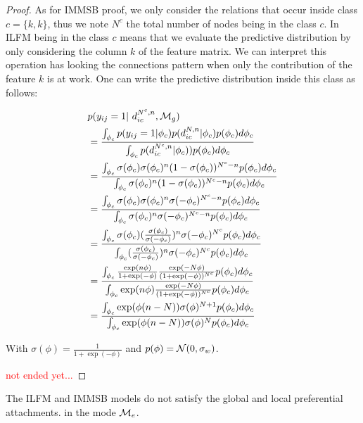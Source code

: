 \begin{proof}
As for IMMSB proof, we only consider the relations  that occur inside class $c=\{k,k\}$, thus we note $N^c$ the total number of nodes being in the class $c$. In ILFM being in the class $c$ means that we evaluate the predictive distribution by only considering the column $k$ of the feature matrix. We can interpret this operation has looking the connections pattern when only the contribution of the feature $k$ is at work. One can write the predictive distribution inside this class as follows:

\begin{align*}
&\p(y_{ij}=1 | d_{ic}^{N^c,n}, \M_g)  \\
&=  \frac{ \int_{\phi_{c}} p(y_{ij}=1|\phi_{c}) p(d_{ic}^{N,n} | \phi_{c}) p(\phi_{c}) d\phi_{c}}{\int_{\phi_{c}} \p(d_{ic}^{N^c,n} | \phi_{c}))       p(\phi_{c}) d\phi_{c}} \\
&= \frac{ \int_{\phi_{c}} \sigma(\phi_c) \sigma(\phi_c)^n (1-\sigma(\phi_c))^{N^c-n}     p(\phi_{c}) d\phi_{c}}{\int_{\phi_{c}}  \sigma(\phi_c)^n (1-\sigma(\phi_c))^{N^c-n}      p(\phi_{c}) d\phi_{c}} \\
&= \frac{ \int_{\phi_{c}} \sigma(\phi_c) \sigma(\phi_c)^n \sigma(-\phi_c)^{N^c-n}     p(\phi_{c}) d\phi_{c}}{\int_{\phi_{c}}  \sigma(\phi_c)^n \sigma(-\phi_c)^{N^c-n}      p(\phi_{c}) d\phi_{c}} \\
&= \frac{ \int_{\phi_{c}} \sigma(\phi_c) (\frac{\sigma(\phi_c)}{\sigma(-\phi_c)})^n \sigma(-\phi_c)^{N^c}     p(\phi_{c}) d\phi_{c}}{\int_{\phi_{c}}  (\frac{\sigma(\phi_c)}{\sigma(-\phi_c)})^n \sigma(-\phi_c)^{N^c}     p(\phi_{c}) d\phi_{c}} \\
&= \frac{ \int_{\phi_{c}} \frac{\exp(n\phi)}{1+\exp(-\phi)} \frac{\exp(-N\phi)}{(1+\exp(-\phi))^{N^c}}  p(\phi_{c}) d\phi_{c}}{\int_{\phi_{c}}  \exp(n\phi) \frac{\exp(-N\phi)}{(1+\exp(-\phi))^{N^c}}   p(\phi_{c}) d\phi_{c}} \\
&= \frac{ \int_{\phi_{c}} \exp(\phi(n-N)) \sigma(\phi)^{N+1} p(\phi_{c}) d\phi_{c}}{\int_{\phi_{c}} \exp(\phi(n-N)) \sigma(\phi)^{N} p(\phi_{c}) d\phi_{c}} \\
\end{align*}

With $\sigma(\phi) = \frac{1}{1+\exp(-\phi)}$ and $p(\phi) = \mathcal{N}(0, \sigma_w)$.


\textcolor{red}{not ended yet...}
\end{proof}

\begin{proposition}
	The ILFM and IMMSB models do not satisfy the global and local preferential attachments. in the mode $\mathcal{M}_e$.
\end{proposition}

